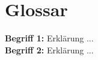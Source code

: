 \section*{Glossar}

\textbf{Begriff 1:} Erklärung ...\\[1ex]
\textbf{Begriff 2:} Erklärung ...\\[1ex]
